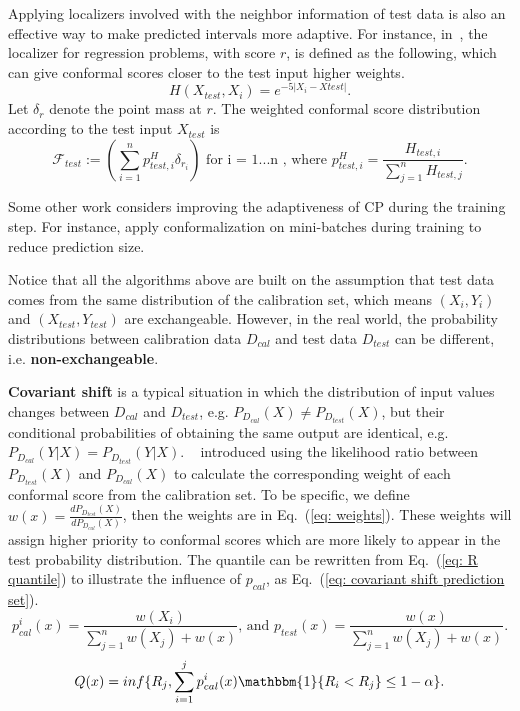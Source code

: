 Applying localizers involved with the neighbor information of test data is also an effective way to make predicted intervals more adaptive. For instance, in~\cite{guan2023localized}, the localizer for regression problems, with score $r$, is defined as the following, which can give conformal scores closer to the test input higher weights.
\begin{equation}
H(X_{test},X_i)=e^{-5|X_i-X{test}|}.
\end{equation}
Let $\delta _r$ denote the point mass at $r$. The weighted conformal score distribution according to the test input $X_{test}$ is
\begin{equation}
    \mathcal{F}_{test}:=(\sum_{i=1}^n p_{test,i}^H \delta_r_i) \text{ for i = 1...n}\text{ , where }p_{test,i}^H=\frac{H_{test,i}}{\sum_{j=1}^n H_{test,j}}.
\end{equation}

Some other work considers improving the adaptiveness of CP during the training step. For instance, \cite{stutz2021learning} apply conformalization on mini-batches during training to reduce prediction size.

Notice that all the algorithms above are built on the assumption that test data comes from the same distribution of the calibration set, which means $(X_i, Y_i)$ and $(X_{test}, Y_{test})$ are exchangeable. However, in the real world, the probability distributions between calibration data $D_{cal}$ and test data $D_{test}$ can be different, i.e. \textbf{non-exchangeable}. 

\textbf{Covariant shift} is a typical situation in which the distribution of input values changes between $D_{cal}$ and $D_{test}$, e.g. $P_{D_{cal}}(X)\neq P_{D_{test}}(X)$, but their conditional probabilities of obtaining the same output are identical, e.g. $P_{D_{cal}}(Y|X) = P_{D_{test}}(Y|X)$.  ~\cite{tibshirani2019conformal} introduced using the likelihood ratio between $P_{D_{test}}(X)$ and $P_{D_{cal}}(X)$ to calculate the corresponding weight of each conformal score from the calibration set. To be specific, we define $w(x)=\frac{dP_{D_{test}}(X)}{dP_{D_{cal}}(X)}$, then the weights are in Eq.~(\ref{eq: weights}). These weights will assign higher priority to conformal scores which are more likely to appear in the test probability distribution. The quantile can be rewritten from Eq.~(\ref{eq: R quantile}) to illustrate the influence of $p_{cal}$, as Eq.~(\ref{eq: covariant shift prediction set}).
\begin{equation}\label{eq: weights}
p_{cal}^i(x)=\frac{w(X_i)}{\sum_{j=1}^n w(X_j)+w(x)}\text{, and } p_{test}(x)=\frac{w(x)}{\sum_{j=1}^n w(X_j)+w(x)}.
\end{equation}
\begin{equation}\label{eq: covariant shift prediction set}
Q(x) = inf\{R_j,\sum_{i=1}^j p_{cal}^i(x)\mathbbm{1}\{R_i<R_j\}\leq 1-\alpha \}.
\end{equation}

